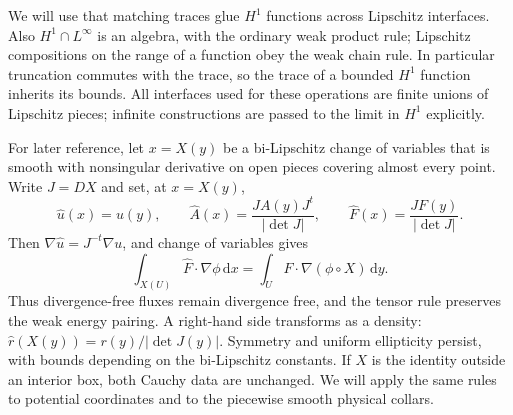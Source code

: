 \documentclass[11pt]{article}
\numberwithin{equation}{section}
\theoremstyle{definition}
\theoremstyle{remark}
\newcommand{\dd}{\,\mathrm d}
\newcommand{\abs}[1]{\left\lvert #1\right\rvert}
\begin{document}
We will use that matching traces glue $H^1$ functions across Lipschitz
interfaces. Also $H^1\cap L^\infty$ is an algebra, with the ordinary
weak product rule; Lipschitz compositions on the range of a function
obey the weak chain rule. In particular truncation commutes with the
trace, so the trace of a bounded $H^1$ function inherits its bounds.
All interfaces used for these operations are finite unions of
Lipschitz pieces; infinite constructions are passed to the limit in
$H^1$ explicitly.

For later reference, let $x=X(y)$ be a bi-Lipschitz change of variables
that is smooth with nonsingular derivative on open pieces covering
almost every point. Write $J=DX$ and set, at $x=X(y)$,
\begin{equation}\label{eq:pushforward}
 \widehat u(x)=u(y),\qquad
 \widehat A(x)=\frac{J A(y)J^t}{\abs{\det J}},\qquad
 \widehat F(x)=\frac{J F(y)}{\abs{\det J}}.
\end{equation}
Then $\nabla\widehat u=J^{-t}\nabla u$, and change of variables gives
\begin{equation}\label{eq:pushforward-test}
 \int_{X(U)}\widehat F\cdot\nabla\phi\dd x
 =\int_U F\cdot\nabla(\phi\circ X)\dd y.
\end{equation}
Thus divergence-free fluxes remain divergence free, and the tensor
rule preserves the weak energy pairing. A right-hand side transforms
as a density: $\widehat r(X(y))=r(y)/\abs{\det J(y)}$.
Symmetry and uniform ellipticity persist, with bounds depending on
the bi-Lipschitz constants. If $X$ is the identity outside an interior
box, both Cauchy data are unchanged. We will apply the same rules to
potential coordinates and to the piecewise smooth physical collars.




\begingroup
\raggedright

\endgroup
\end{document}
